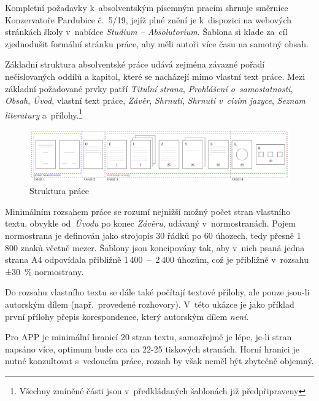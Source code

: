 Kompletní požadavky k~absolventským písemným pracím shrnuje směrnice
Konzervatoře Pardubice č.~5/19, jejíž plné znění je k~dispozici na webových
stránkách školy v~nabídce \textit{Studium – Absolutorium}. Šablona si klade
za~cíl zjednodušit formální stránku práce, aby měli autoři více času na samotný
obsah.

Základní struktura absolventské práce udává zejména závazné pořadí nečíslovaných
oddílů a kapitol, které se nacházejí mimo vlastní text práce. Mezi základní
požadované prvky patří \textit{Titulní strana}, \textit{Prohlášení
o~samostatnosti}, \textit{Obsah}, \textit{Úvod}, vlastní text práce,
\textit{Závěr}, \textit{Shrnutí}, \textit{Shrnutí v~cizím jazyce},
\textit{Seznam literatury} a~přílohy.\footnote{Všechny zmíněné části jsou
v~předkládaných šablonách již předpřipraveny}

\begin{figure}[!ht]
	\begin{center}
		\includegraphics[width=\textwidth]{./obrazky/diagram-app.pdf}
    \end{center}

	\caption{Struktura práce}
\end{figure}

Minimálním rozsahem práce se rozumí nejnižší možný počet stran vlastního textu,
obvykle od~\textit{Úvodu} po konec \textit{Závěru}, udávaný v~normostranách.
Pojem normostrana je definován jako strojopis 30 řádků po 60 úhozech, tedy
přesně 1\,800 znaků včetně mezer. Šablony jsou koncipovány tak, aby v~nich psaná
jedna strana A4 odpovídala přibližně 1\,400~–~2\,400 úhozům, což je přibližně
v~rozsahu ±30~\% normostrany.

Do rozsahu vlastního textu se dále také počítají textové přílohy, ale pouze
jsou-li autorským dílem (např.~provedené rozhovory). V~této ukázce je jako
příklad první přílohy přepis korespondence, který autorským dílem \textit{není}.

\noindent
Pro APP je minimální hranicí 20 stran textu, samozřejmě je lépe, je-li stran
napsáno více, optimum bude cca na 22-25 tiskových stranách. Horní hranici je
nutné konzultovat s~vedoucím práce, rozsah by však neměl být zbytečně objemný.

